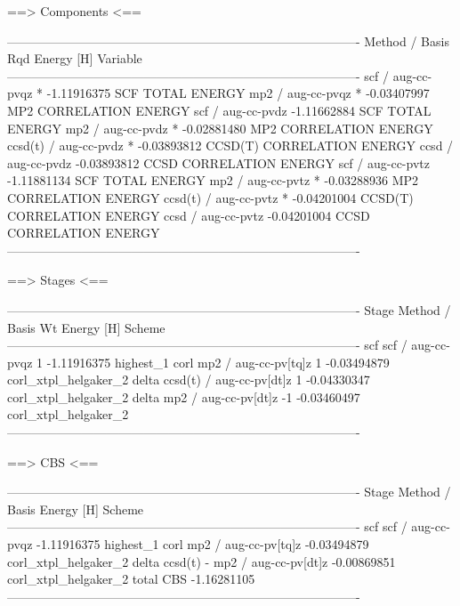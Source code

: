 \begin{Snippet}
 ==> Components <==

-------------------------------------------------------------------------------------
                  Method / Basis            Rqd   Energy [H]   Variable
-------------------------------------------------------------------------------------
                     scf / aug-cc-pvqz        *  -1.11916375   SCF TOTAL ENERGY
                     mp2 / aug-cc-pvqz        *  -0.03407997   MP2 CORRELATION ENERGY
                     scf / aug-cc-pvdz           -1.11662884   SCF TOTAL ENERGY
                     mp2 / aug-cc-pvdz        *  -0.02881480   MP2 CORRELATION ENERGY
                 ccsd(t) / aug-cc-pvdz        *  -0.03893812   CCSD(T) CORRELATION ENERGY
                    ccsd / aug-cc-pvdz           -0.03893812   CCSD CORRELATION ENERGY
                     scf / aug-cc-pvtz           -1.11881134   SCF TOTAL ENERGY
                     mp2 / aug-cc-pvtz        *  -0.03288936   MP2 CORRELATION ENERGY
                 ccsd(t) / aug-cc-pvtz        *  -0.04201004   CCSD(T) CORRELATION ENERGY
                    ccsd / aug-cc-pvtz           -0.04201004   CCSD CORRELATION ENERGY
-------------------------------------------------------------------------------------

 ==> Stages <==

-------------------------------------------------------------------------------------
    Stage         Method / Basis             Wt   Energy [H]   Scheme
-------------------------------------------------------------------------------------
      scf            scf / aug-cc-pvqz        1  -1.11916375   highest_1
     corl            mp2 / aug-cc-pv[tq]z     1  -0.03494879   corl_xtpl_helgaker_2
    delta        ccsd(t) / aug-cc-pv[dt]z     1  -0.04330347   corl_xtpl_helgaker_2
    delta            mp2 / aug-cc-pv[dt]z    -1  -0.03460497   corl_xtpl_helgaker_2
-------------------------------------------------------------------------------------

 ==> CBS <==

-------------------------------------------------------------------------------------
    Stage         Method / Basis                  Energy [H]   Scheme
-------------------------------------------------------------------------------------
      scf            scf / aug-cc-pvqz           -1.11916375   highest_1
     corl            mp2 / aug-cc-pv[tq]z        -0.03494879   corl_xtpl_helgaker_2
    delta  ccsd(t) - mp2 / aug-cc-pv[dt]z        -0.00869851   corl_xtpl_helgaker_2
    total            CBS                         -1.16281105
-------------------------------------------------------------------------------------
\end{Snippet}

